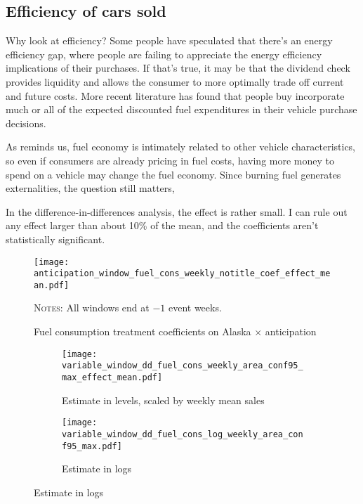 \documentclass[11pt,letterpaper,oneside]{article}
\begin{document}
\begin{doublespacing}
\subsection{Efficiency of cars sold}

Why look at efficiency?
Some people have speculated that there's an energy efficiency gap, where people are failing to appreciate the energy efficiency implications of their purchases.
If that's true, it may be that the dividend check provides liquidity and allows the consumer to more optimally trade off current and future costs.
More recent literature has found that people buy incorporate much \parencite{allcott2014gasoline} or all \parencite{busse2013consumers, grigolon2014consumer, sallee2016consumers} of the expected discounted fuel expenditures in their vehicle purchase decisions.

As \textcite{kiso2013automobilefueleconomy} reminds us, fuel economy is intimately related to other vehicle characteristics, so even if consumers are already pricing in fuel costs, having more money to spend on a vehicle may change the fuel economy.
Since burning fuel generates externalities, the question still matters,

In the difference\hyp{}in\hyp{}differences analysis, the effect is rather small.
I can rule out any effect larger than about 10\% of the mean, and the coefficients aren't statistically significant.




\begin{figure}[hbt]
    \caption{Fuel consumption treatment coefficients on Alaska $\times$ anticipation}
    \texttt{[image: anticipation\_window\_fuel\_cons\_weekly\_notitle\_coef\_effect\_mean.pdf]}

    {\footnotesize
    \textsc{Notes:}
    All windows end at $-1$ event weeks.
    }
\end{figure}


\begin{figure}[hbt]
    \caption{Fuel consumption effects with varying windows}
    \begin{subfigure}{\linewidth}
        \caption{Estimate in levels, scaled by weekly mean sales}
        \texttt{[image: variable\_window\_dd\_fuel\_cons\_weekly\_area\_conf95\_max\_effect\_mean.pdf]}
    \end{subfigure}
    \begin{subfigure}{\linewidth}
        \caption{Estimate in logs}
        \texttt{[image: variable\_window\_dd\_fuel\_cons\_log\_weekly\_area\_conf95\_max.pdf]}
    \end{subfigure}



\end{figure}
\end{doublespacing}
\end{document}
